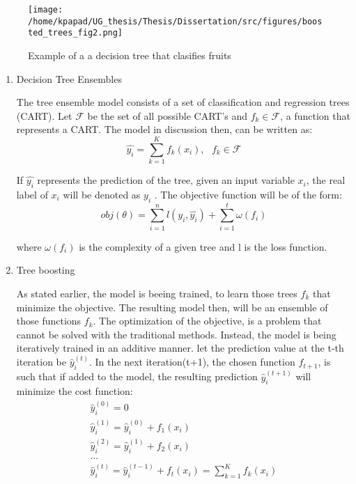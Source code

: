 \begin{figure}[h]
\centering
\texttt{[image: /home/kpapad/UG\_thesis/Thesis/Dissertation/src/figures/boosted\_trees\_fig2.png]}
\caption{Example of a a decision tree that clasifies fruits}
\label{fig:decision_tree}
\end{figure}
\begin{enumerate}
\item Decision Tree Ensembles
\label{sec:orga38fe01}

The tree ensemble model consists of a set of classification and regression trees (CART).
Let \(\mathcal{F}\) be the set of all possible CART's and \(f_{k} \in \mathcal{F}\), a function that represents a CART. The model in discussion then, can be written as:
\begin{equation}
\hat{y_{i}} = \sum_{k=1}^{K} f_{k}(x_{i}),\text{ } f_{k} \in \mathcal{F}
\end{equation}

If \(\hat{y_{i}}\) represents the prediction of the tree, given an input variable \(x_{i}\), the real label of \(x_{i}\) will be denoted as \(y_{i}\)  . The objective function will be of the form:
\begin{equation}
obj(\theta) = \sum_{i=1}^{n} l(y_{i}, \hat{y_{i}}) + \sum_{i=1}^{t}\omega(f_{i})
\end{equation}

where \(\omega(f_{i})\) is the complexity of a given tree  and l is the loss function.

\item Tree boosting
\label{sec:org1b1fb81}

As stated earlier, the model is beeing trained, to learn those trees \(f_{k}\) that minimize the objective. The resulting model then, will be an ensemble of those functions \(f_{k}\).
The optimization of the objective, is a problem that cannot be solved with the traditional methods. Instead, the model is being iteratively trained in an additive manner.\cite{Chen_2016}
let the prediction value at the t-th iteration be \(\hat{y}^{(t)}_{i}\). In the next iteration(t+1), the chosen function \(f_{t+1}\), is such that if added to the model, the resulting prediction \(\hat{y}^{(t+1)}_{i}\) will minimize the cost function:
\begin{equation}
\begin{matrix}
\hat{y}^{(0)}_{i} = 0 \\
\hat{y}^{(1)}_{i} =\hat{y}^{(0)}_{i} + f_{1}(x_{i}) \\
\hat{y}^{(2)}_{i} =\hat{y}^{(1)}_{i} + f_{2}(x_{i}) \\
\dots \\
\hat{y}_{i}^{(t)} = \hat{y}_{i}^{(t-1)} + f_{t}(x_{i})= \sum_{k=1}^{K} f_{k}(x_{i}) \\
\end{matrix}
\end{equation}


\end{enumerate}
